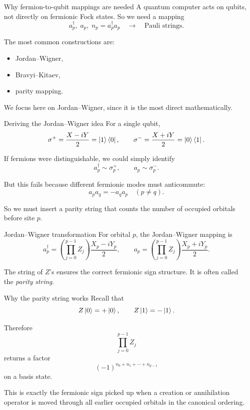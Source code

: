 \documentclass[aspectratio=169]{beamer}
\begin{document}
\begin{frame}{Why fermion-to-qubit mappings are needed}
A quantum computer acts on qubits, not directly on fermionic Fock states.
So we need a mapping
\[
a_p^\dagger,\; a_p,\; n_p=a_p^\dagger a_p
\quad \longrightarrow \quad
\text{Pauli strings}.
\]

The most common constructions are:
\begin{itemize}
\item Jordan--Wigner,
\item Bravyi--Kitaev,
\item parity mapping.
\end{itemize}

We focus here on Jordan--Wigner, since it is the most direct mathematically.
\end{frame}

\begin{frame}{Deriving the Jordan--Wigner idea}
For a single qubit,
\[
\sigma^+ = \frac{X-iY}{2} = \ket{1}\bra{0},
\qquad
\sigma^- = \frac{X+iY}{2} = \ket{0}\bra{1}.
\]

If fermions were distinguishable, we could simply identify
\[
a_p^\dagger \sim \sigma_p^+,\qquad a_p \sim \sigma_p^-.
\]

But this fails because different fermionic modes must anticommute:
\[
a_p a_q = - a_q a_p \quad (p\neq q).
\]

So we must insert a parity string that counts the number of occupied orbitals before site \(p\).
\end{frame}

\begin{frame}{Jordan--Wigner transformation}
For orbital \(p\), the Jordan--Wigner mapping is
\[
a_p^\dagger
=
\left(\prod_{j=0}^{p-1} Z_j\right)\frac{X_p-iY_p}{2},
\qquad
a_p
=
\left(\prod_{j=0}^{p-1} Z_j\right)\frac{X_p+iY_p}{2}.
\]

The string of \(Z\)'s ensures the correct fermionic sign structure.
It is often called the \emph{parity string}.
\end{frame}

\begin{frame}{Why the parity string works}
Recall that
\[
Z \ket{0} = +\ket{0},\qquad Z\ket{1} = -\ket{1}.
\]

Therefore
\[
\prod_{j=0}^{p-1} Z_j
\]
returns a factor
\[
(-1)^{n_0+n_1+\cdots+n_{p-1}}
\]
on a basis state.

This is exactly the fermionic sign picked up when a creation or annihilation operator is moved through all earlier occupied orbitals in the canonical ordering.
\end{frame}
\end{document}
